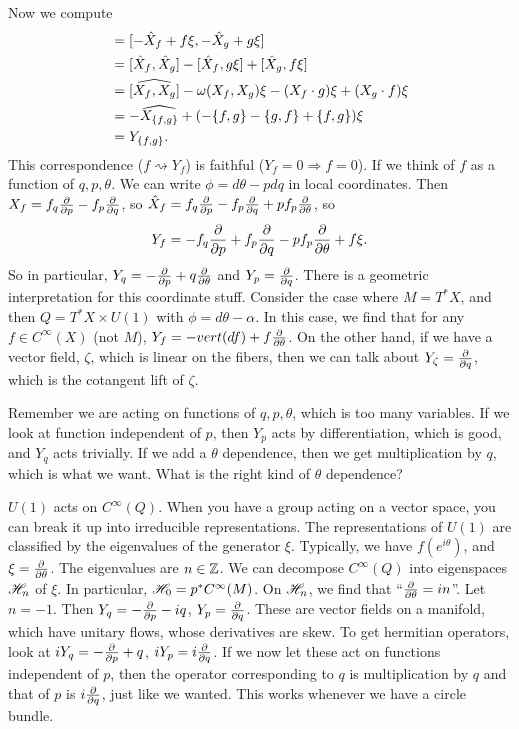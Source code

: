  Now we compute
 \begin{align*}
   [Y_f,y_g] &= [-\hat X_f + f\xi, -\hat X_g + g\xi]\\
   &= [\hat X_f,\hat X_g] - [\hat X_f, g\xi] + [\hat X_g,f\xi]\\
   &= \widehat{[X_f,X_g]} - \w(X_f,X_g)\xi - (X_f\cdot g)\xi + (X_g\cdot f)\xi\\
   &= -\widehat{X_{\{f,g\}}} + (-\{f,g\} - \{g,f\} + \{f,g\})\xi\\
   &= Y_{\{f,g\}}.
 \end{align*}
 This correspondence ($f\rightsquigarrow Y_f$) is faithful ($Y_f=0 \Rightarrow f=0$).
 If we think of $f$ as a function of $q,p,\theta$.  We can write $\phi = d\theta -
 pdq$ in local coordinates.  Then $X_f = f_q\frac{\partial }{\partial p} - f_p\frac{\partial }{\partial q}$, so $\hat X_f
 = f_q\frac{\partial }{\partial p} - f_p\frac{\partial }{\partial q} + pf_p \frac{\partial }{\partial \theta}$, so
 \[
    Y_f = -f_q\frac{\partial }{\partial p} + f_p\frac{\partial }{\partial q} - pf_p \frac{\partial }{\partial \theta} + f\xi.
 \]
 So in particular, $Y_q = -\frac{\partial }{\partial p} + q\frac{\partial }{\partial \theta}$ and $Y_p = \frac{\partial }{\partial q}$.
 There is a geometric interpretation for this coordinate stuff.  Consider the case
 where $M=T^*X$, and then $Q= T^*X \times U(1)$ with $\phi = d\theta - \alpha$.  In
 this case, we find that for any $f\in C^\infty(X)$ (not $M$),
 $Y_f=-vert(df)+f\frac{\partial }{\partial \theta}$.  On the other hand, if we have a vector field,
 $\zeta$, which is linear on the fibers, then we can talk about $Y_\zeta =
 \frac{\partial }{\partial q}$, which is the cotangent lift of $\zeta$.

 Remember we are acting on functions of $q,p,\theta$, which is too many variables.  If
 we look at function independent of $p$, then $Y_p$ acts by differentiation, which is
 good, and $Y_q$ acts trivially.  If we add a $\theta$ dependence, then we get
 multiplication by $q$, which is what we want. What is the right kind of $\theta$
 dependence?

 $U(1)$ acts on $C^\infty(Q)$.  When you have a group acting on a vector space, you
 can break it up into irreducible representations.  The representations of $U(1)$ are
 classified by the eigenvalues of the generator $\xi$.  Typically, we have
 $f(e^{i\theta})$, and $\xi = \frac{\partial }{\partial \theta}$.  The eigenvalues are $n\in \mathbb{Z}$.  We
 can decompose $C^\infty(Q)$ into eigenspaces $\mathscr{H}_n$ of $\xi$.  In particular,
 $\mathscr{H}_0=p^*C^\infty(M)$.  On $\mathscr{H}_n$, we find that ``$\frac{\partial }{\partial \theta}=in$''.  Let
 $n=-1$.  Then $Y_q = -\frac{\partial }{\partial p} - iq$, $Y_p = \frac{\partial }{\partial q}$.  These are vector fields
 on a manifold, which have unitary flows, whose derivatives are skew.  To get
 hermitian operators, look at $iY_q = -\frac{\partial }{\partial p} + q$, $iY_p = i\frac{\partial }{\partial q}$.  If we
 now let these act on functions independent of $p$, then the operator corresponding to
 $q$ is multiplication by $q$ and that of $p$ is $i\frac{\partial }{\partial q}$, just like we wanted.
 This works whenever we have a circle bundle.

